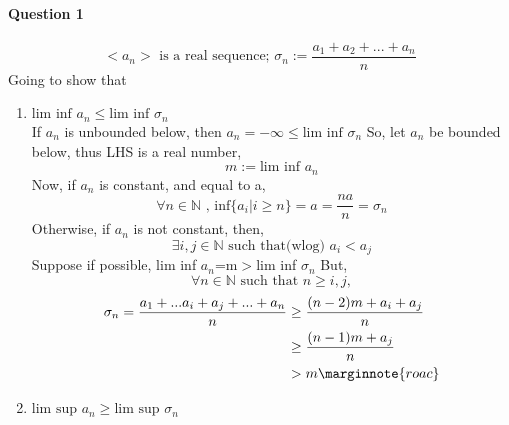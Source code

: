 \documentclass[20pt]{extarticle} %
\begin{document}
\paragraph{Question 1}
\[ <a_n>\text{ is a real sequence; }\sigma_n := \frac{a_1+a_2+...+a_n}{n} \]
Going to show that
\begin{enumerate}[label=\Roman*]
	\item $\text{lim inf } a_n \leq \text{lim inf }\sigma_n  $ \\
		If $a_n$ is unbounded below, then $a_n = -\infty \leq \text{lim inf }\sigma_n$
		So, let $a_n$ be bounded below, thus LHS is a real number,
		\[ m:= \text{lim inf }a_n \]
		Now, if $a_n$ is constant, and equal to a,
		\[ \forall n \in \mathbb{N} \text{ , inf} \{ a_i | i\geq n \} =a = \frac{na}{n} =\sigma_n\]
		Otherwise, if $a_n$ is not constant, then,
		\[ \exists i,j \in \mathbb{N} \text{ such that(wlog) } a_i < a_j\]
		Suppose if possible, lim inf $a_n$=m$>$lim inf $\sigma_n$
		But, \[ \forall n \in \mathbb{N} \text{ such that } n \geq i,j, \]
\begin{equation*}
\begin{split}
		\sigma_n= \frac{a_1 + ... a_i + a_j + ... + a_n}{n} & \geq{\frac{(n-2)m+a_i+a_j}{n}}\\
								    & \geq \frac{(n-1)m+a_j}{n}\\
								    & >m \marginnote{roac}
\end{split}
\end{equation*}
	\item $\text{lim sup } a_n \geq \text{lim sup }\sigma_n  $
\end{enumerate}
\end{document}
